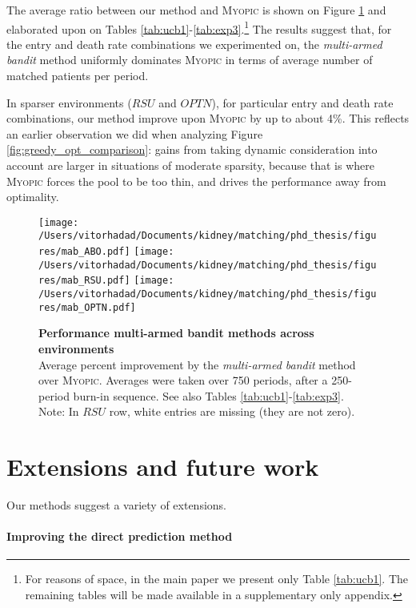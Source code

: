 \begin{itemize}
The average ratio between our method and \textsc{Myopic} is shown on Figure \ref{fig:mab} and elaborated upon on Tables \ref{tab:ucb1}-\ref{tab:exp3}.\footnote{For reasons of space, in the main paper we present only Table \ref{tab:ucb1}. The remaining tables will be made available in a supplementary only appendix.} The results suggest that, for the entry and death rate combinations we experimented on, the \emph{multi-armed bandit} method uniformly dominates \textsc{Myopic} in terms of average number of matched patients per period.

In sparser environments ($RSU$ and $OPTN$), for particular entry and death rate combinations, our method improve upon \textsc{Myopic} by up to about 4\%. This reflects an earlier observation we did when analyzing Figure \ref{fig:greedy_opt_comparison}: gains from taking dynamic consideration into account are larger in situations of moderate sparsity, because that is where \textsc{Myopic} forces the pool to be too thin, and drives the performance away from optimality.


\begin{figure}
\centering
\hspace*{-1.6cm}
\texttt{[image: /Users/vitorhadad/Documents/kidney/matching/phd\_thesis/figures/mab\_ABO.pdf]}
\hspace*{-1.6cm}
\texttt{[image: /Users/vitorhadad/Documents/kidney/matching/phd\_thesis/figures/mab\_RSU.pdf]}
\hspace*{-1.6cm}
\texttt{[image: /Users/vitorhadad/Documents/kidney/matching/phd\_thesis/figures/mab\_OPTN.pdf]}
\caption{\textbf{Performance multi-armed bandit methods across environments} \\
Average percent improvement by the \emph{multi-armed bandit} method over \textsc{Myopic}. Averages were taken over 750 periods, after a 250-period burn-in sequence. See also Tables \ref{tab:ucb1}-\ref{tab:exp3}. \\
{\scriptsize Note: In $RSU$ row, white entries are missing (they are not zero).}}
\label{fig:mab}
\end{figure}

\section{Extensions and future work} \label{sec:extensions}

Our methods suggest a variety of extensions. 


\paragraph{Improving the direct prediction method}


\end{itemize}

